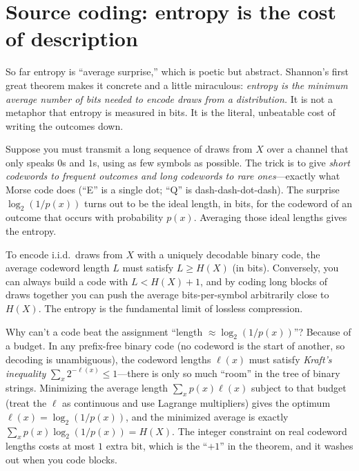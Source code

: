 \section{Source coding: entropy is the cost of description}
\label{ch33:source-coding}

So far entropy is ``average surprise,'' which is poetic but abstract. Shannon's first great theorem makes
it concrete and a little miraculous: \emph{entropy is the minimum average number of bits needed to
encode draws from a distribution.} It is not a metaphor that entropy is measured in bits. It is the
literal, unbeatable cost of writing the outcomes down.

\begin{intuitionbox}
Suppose you must transmit a long sequence of draws from $X$ over a channel that only speaks $0$s and $1$s,
using as few symbols as possible. The trick is to give \emph{short codewords to frequent outcomes and
long codewords to rare ones}---exactly what Morse code does (``E'' is a single dot; ``Q'' is dash-dash-dot-dash).
The surprise $\log_2(1/p(x))$ turns out to be the ideal length, in bits, for the codeword of an outcome
that occurs with probability $p(x)$. Averaging those ideal lengths gives the entropy.
\end{intuitionbox}

\begin{theorem}
\label{ch33:source-coding-thm}
To encode i.i.d.\ draws from $X$ with a uniquely decodable binary code, the average codeword length $L$
must satisfy $L \ge H(X)$ (in bits). Conversely, you can always build a code with $L < H(X) + 1$, and by
coding long blocks of draws together you can push the average bits-per-symbol arbitrarily close to
$H(X)$. The entropy is the fundamental limit of lossless compression.
\end{theorem}

\begin{walkbox}
Why can't a code beat the assignment ``length $\approx \log_2(1/p(x))$''? Because of a budget. In any
prefix-free binary code (no codeword is the start of another, so decoding is unambiguous), the codeword
lengths $\ell(x)$ must satisfy \emph{Kraft's inequality} $\sum_x 2^{-\ell(x)} \le 1$---there is only so
much ``room'' in the tree of binary strings. Minimizing the average length $\sum_x p(x)\ell(x)$ subject to
that budget (treat the $\ell$ as continuous and use Lagrange multipliers) gives the optimum $\ell(x) =
\log_2(1/p(x))$, and the minimized average is exactly $\sum_x p(x)\log_2(1/p(x)) = H(X)$. The integer
constraint on real codeword lengths costs at most $1$ extra bit, which is the ``$+1$'' in the theorem, and
it washes out when you code blocks.
\end{walkbox}

